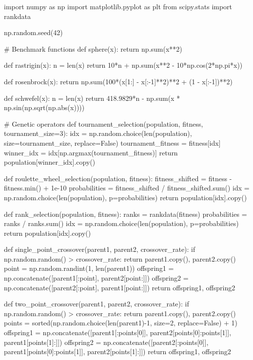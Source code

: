 \documentclass[a4paper, 11pt]{article}
\begin{document}
\begin{pycode}
import numpy as np
import matplotlib.pyplot as plt
from scipy.stats import rankdata

np.random.seed(42)

# Benchmark functions
def sphere(x):
    return np.sum(x**2)

def rastrigin(x):
    n = len(x)
    return 10*n + np.sum(x**2 - 10*np.cos(2*np.pi*x))

def rosenbrock(x):
    return np.sum(100*(x[1:] - x[:-1]**2)**2 + (1 - x[:-1])**2)

def schwefel(x):
    n = len(x)
    return 418.9829*n - np.sum(x * np.sin(np.sqrt(np.abs(x))))

# Genetic operators
def tournament_selection(population, fitness, tournament_size=3):
    idx = np.random.choice(len(population), size=tournament_size, replace=False)
    tournament_fitness = fitness[idx]
    winner_idx = idx[np.argmax(tournament_fitness)]
    return population[winner_idx].copy()

def roulette_wheel_selection(population, fitness):
    fitness_shifted = fitness - fitness.min() + 1e-10
    probabilities = fitness_shifted / fitness_shifted.sum()
    idx = np.random.choice(len(population), p=probabilities)
    return population[idx].copy()

def rank_selection(population, fitness):
    ranks = rankdata(fitness)
    probabilities = ranks / ranks.sum()
    idx = np.random.choice(len(population), p=probabilities)
    return population[idx].copy()

def single_point_crossover(parent1, parent2, crossover_rate):
    if np.random.random() > crossover_rate:
        return parent1.copy(), parent2.copy()
    point = np.random.randint(1, len(parent1))
    offspring1 = np.concatenate([parent1[:point], parent2[point:]])
    offspring2 = np.concatenate([parent2[:point], parent1[point:]])
    return offspring1, offspring2

def two_point_crossover(parent1, parent2, crossover_rate):
    if np.random.random() > crossover_rate:
        return parent1.copy(), parent2.copy()
    points = sorted(np.random.choice(len(parent1)-1, size=2, replace=False) + 1)
    offspring1 = np.concatenate([parent1[:points[0]], parent2[points[0]:points[1]],
                                  parent1[points[1]:]])
    offspring2 = np.concatenate([parent2[:points[0]], parent1[points[0]:points[1]],
                                  parent2[points[1]:]])
    return offspring1, offspring2


\end{pycode}
\end{document}
